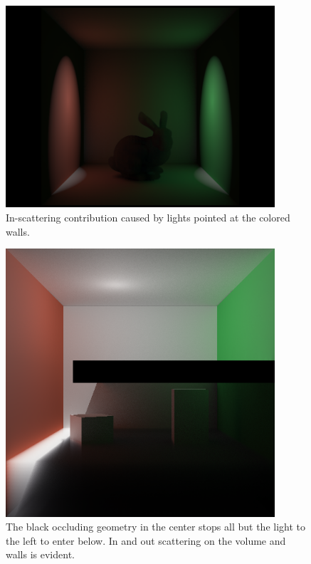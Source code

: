 \documentclass[runningheads]{llncs}
\begin{document}
\begin{figure}[h!]
    \centering
    \includegraphics[width=100mm]{img/two_light_bunny_indir.png}
    \caption{In-scattering contribution caused by lights pointed at the colored walls.}
\end{figure}

\begin{figure}[h!]
    \centering
    \includegraphics[width=100mm]{img/one_side.png}
    \caption{The black occluding geometry in the center stops all but the light to the left to enter below.  In and out scattering on the volume and walls is evident.}
\end{figure}
\end{document}
